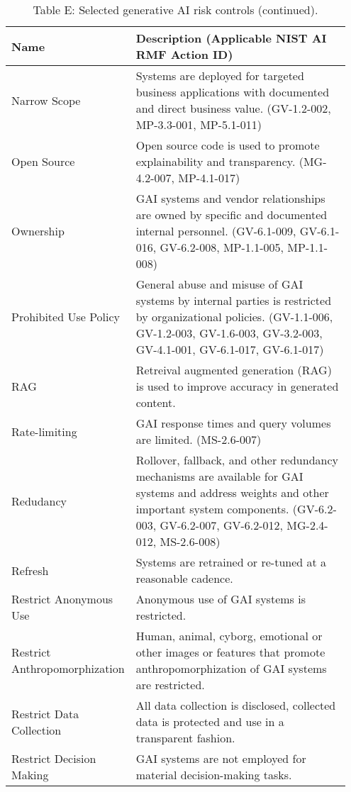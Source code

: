 \documentclass[fleqn]{article}
\begin{document}
\begin{table}[H]
	\caption*{Table E: Selected generative AI risk controls (continued).}
	\label{tab:controls_cont2}
	\footnotesize
	\begin{tabular}{|m{0.25\linewidth} |m{0.70\linewidth} |}
		\hline
		\textbf{Name} & \textbf{Description} (Applicable NIST AI RMF Action ID)\\
		\hline		
		Narrow Scope & Systems are deployed for targeted business applications with documented and direct business value. (GV-1.2-002, MP-3.3-001, MP-5.1-011) \\ \hline
		Open Source & Open source code is used to promote explainability and transparency. (MG-4.2-007, MP-4.1-017) \\ 
		\hline
		Ownership & GAI systems and vendor relationships are owned by specific and documented internal personnel. (GV-6.1-009, GV-6.1-016, GV-6.2-008, MP-1.1-005, MP-1.1-008) \\ \hline
		Prohibited Use Policy & General abuse and misuse of GAI systems by internal parties is restricted by organizational policies. (GV-1.1-006, GV-1.2-003, GV-1.6-003, GV-3.2-003, GV-4.1-001, GV-6.1-017, GV-6.1-017) \\ 
		\hline
		RAG & Retreival augmented generation (RAG) is used to improve accuracy in generated content.  \\ \hline
		Rate-limiting  & GAI response times and query volumes are limited. (MS-2.6-007) \\ 
		\hline
		Redudancy & Rollover, fallback, and other redundancy mechanisms are available for GAI systems and address weights and other important system components. (GV-6.2-003, GV-6.2-007, GV-6.2-012, MG-2.4-012, MS-2.6-008)   \\ 
		\hline
		Refresh & Systems are retrained or re-tuned at a reasonable cadence.  \\ 
		\hline
		Restrict Anonymous Use & Anonymous use of GAI systems is restricted.  \\ 
		\hline
		Restrict Anthropomorphization  & Human, animal, cyborg, emotional or other images or features that promote anthropomorphization of GAI systems are restricted.   \\ 
		\hline
		Restrict Data Collection & All data collection is disclosed, collected data is protected and use in a transparent fashion. \\ 
		\hline		
		Restrict Decision Making  & GAI systems are not employed for material decision-making tasks.  \\ \hline		

\end{tabular}
\end{table}
\end{document}
